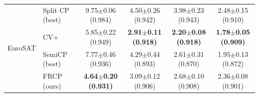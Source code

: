 \begin{table}[t]
\begin{tabular}{llcccc}
\midrule
\multirow{4}{*}{EuroSAT} & Split CP (best) & 9.75$\pm$0.06 {\scriptsize(0.984)} & 4.50$\pm$0.26 {\scriptsize(0.942)} & 3.98$\pm$0.23 {\scriptsize(0.943)} & 2.48$\pm$0.15 {\scriptsize(0.910)}\\
 & CV+ & 5.85$\pm$0.22 {\scriptsize(0.949)} & \textbf{2.91$\pm$0.11 {\scriptsize(0.918)}} & \textbf{2.20$\pm$0.08 {\scriptsize(0.918)}} & \textbf{1.78$\pm$0.05 {\scriptsize(0.909)}}\\
 & SemiCP (best) & 7.77$\pm$0.46 {\scriptsize(0.936)} & 4.29$\pm$0.44 {\scriptsize(0.893)} & 2.61$\pm$0.31 {\scriptsize(0.870)} & 1.95$\pm$0.13 {\scriptsize(0.872)}\\
 & FRCP (ours) & \textbf{4.64$\pm$0.20 {\scriptsize(0.931)}} & 3.09$\pm$0.12 {\scriptsize(0.906)} & 2.68$\pm$0.10 {\scriptsize(0.908)} & 2.36$\pm$0.08 {\scriptsize(0.901)}\\
\bottomrule
\end{tabular}
\end{table}
